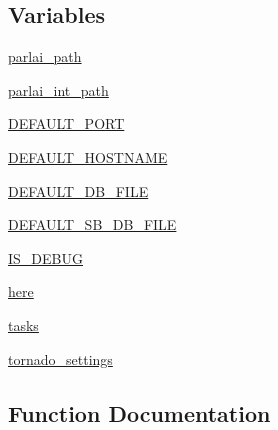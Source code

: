 \subsection*{Variables}
\begin{DoxyCompactItemize}
\item 
\hyperlink{namespaceparlai_1_1mturk_1_1webapp_1_1server_a4655c0f281c309ebedea7bb5c2553a37}{parlai\+\_\+path}
\item 
\hyperlink{namespaceparlai_1_1mturk_1_1webapp_1_1server_a39ddfeedd8f299afd3950be1bb5f0e2a}{parlai\+\_\+int\+\_\+path}
\item 
\hyperlink{namespaceparlai_1_1mturk_1_1webapp_1_1server_ab2dbe49416f69522010b6c9a211af0e3}{D\+E\+F\+A\+U\+L\+T\+\_\+\+P\+O\+RT}
\item 
\hyperlink{namespaceparlai_1_1mturk_1_1webapp_1_1server_a2550c6dcb402e3b6b2f52229e848d6a7}{D\+E\+F\+A\+U\+L\+T\+\_\+\+H\+O\+S\+T\+N\+A\+ME}
\item 
\hyperlink{namespaceparlai_1_1mturk_1_1webapp_1_1server_a7d1b65251987c39df64aeb32f36f6a9f}{D\+E\+F\+A\+U\+L\+T\+\_\+\+D\+B\+\_\+\+F\+I\+LE}
\item 
\hyperlink{namespaceparlai_1_1mturk_1_1webapp_1_1server_a1e2912cd1c7a432b62f8871c8c26ffeb}{D\+E\+F\+A\+U\+L\+T\+\_\+\+S\+B\+\_\+\+D\+B\+\_\+\+F\+I\+LE}
\item 
\hyperlink{namespaceparlai_1_1mturk_1_1webapp_1_1server_a14a39cf63e8f3578e7c5f56f4482c679}{I\+S\+\_\+\+D\+E\+B\+UG}
\item 
\hyperlink{namespaceparlai_1_1mturk_1_1webapp_1_1server_a3cd1097e113507291bebff8bccaf3e6f}{here}
\item 
\hyperlink{namespaceparlai_1_1mturk_1_1webapp_1_1server_a9c1e280a0e70547519ea048b72ce29f4}{tasks}
\item 
\hyperlink{namespaceparlai_1_1mturk_1_1webapp_1_1server_a68ebf686092c5adab8c84111b8723ae5}{tornado\+\_\+settings}
\end{DoxyCompactItemize}


\subsection{Function Documentation}
\mbox{\label{namespaceparlai_1_1mturk_1_1webapp_1_1server_aff248adb38d13b62a05e7d5649321d64}} 
